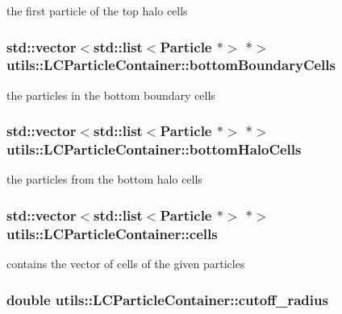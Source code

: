 the first particle of the top halo cells \hypertarget{classutils_1_1LCParticleContainer_a2d7ae0438fdc4fb9f014c8465775c8d1}{
\subsubsection[{bottom\-Boundary\-Cells}]{\setlength{\rightskip}{0pt plus 5cm}std\-::vector$<$std\-::list$<${\bf Particle} $\ast$$>$ $\ast$$>$ utils\-::\-L\-C\-Particle\-Container\-::bottom\-Boundary\-Cells\hspace{0.3cm}{\ttfamily [private]}}}\label{classutils_1_1LCParticleContainer_a2d7ae0438fdc4fb9f014c8465775c8d1}
the particles in the bottom boundary cells \hypertarget{classutils_1_1LCParticleContainer_a7735296727ed8c14d4f6ff99c065bced}{
\subsubsection[{bottom\-Halo\-Cells}]{\setlength{\rightskip}{0pt plus 5cm}std\-::vector$<$std\-::list$<${\bf Particle} $\ast$$>$ $\ast$$>$ utils\-::\-L\-C\-Particle\-Container\-::bottom\-Halo\-Cells\hspace{0.3cm}{\ttfamily [private]}}}\label{classutils_1_1LCParticleContainer_a7735296727ed8c14d4f6ff99c065bced}
the particles from the bottom halo cells \hypertarget{classutils_1_1LCParticleContainer_a58bb20ad90c455f1400c35379784a0ae}{
\subsubsection[{cells}]{\setlength{\rightskip}{0pt plus 5cm}std\-::vector$<$std\-::list$<${\bf Particle} $\ast$$>$ $\ast$$>$ utils\-::\-L\-C\-Particle\-Container\-::cells\hspace{0.3cm}{\ttfamily [private]}}}\label{classutils_1_1LCParticleContainer_a58bb20ad90c455f1400c35379784a0ae}
contains the vector of cells of the given particles \hypertarget{classutils_1_1LCParticleContainer_a47cf29a8a8830ccce0f04f84f20ce740}{
\subsubsection[{cutoff\-\_\-radius}]{\setlength{\rightskip}{0pt plus 5cm}double utils\-::\-L\-C\-Particle\-Container\-::cutoff\-\_\-radius\hspace{0.3cm}{\ttfamily [private]}}}\label{classutils_1_1LCParticleContainer_a47cf29a8a8830ccce0f04f84f20ce740}
